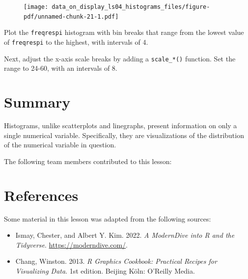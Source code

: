 \documentclass[
  letterpaper,
  DIV=11,
  numbers=noendperiod]{scrreprt}
\providecommand{\tightlist}{%
  \setlength{\itemsep}{0pt}\setlength{\parskip}{0pt}}\usepackage{longtable,booktabs,array}
\begin{document}
\begin{figure}[H]

{\centering \texttt{[image: data\_on\_display\_ls04\_histograms\_files/figure-pdf/unnamed-chunk-21-1.pdf]}

}

\end{figure}

\begin{tcolorbox}[enhanced jigsaw, colframe=quarto-callout-tip-color-frame, colbacktitle=quarto-callout-tip-color!10!white, titlerule=0mm, opacitybacktitle=0.6, breakable, toprule=.15mm, arc=.35mm, rightrule=.15mm, colback=white, bottomrule=.15mm, opacityback=0, toptitle=1mm, left=2mm, bottomtitle=1mm, title=\textcolor{quarto-callout-tip-color}{\faLightbulb}\hspace{0.5em}{Practice}, leftrule=.75mm, coltitle=black]

Plot the \texttt{freqrespi} histogram with bin breaks that range from
the lowest value of \texttt{freqrespi} to the highest, with intervals of
4.

Next, adjust the x-axis scale breaks by adding a \texttt{scale\_*()}
function. Set the range to 24-60, with an intervals of 8.

\end{tcolorbox}

\hypertarget{summary-1}{%
\section{Summary}\label{summary-1}}

Histograms, unlike scatterplots and linegraphs, present information on
only a single numerical variable. Specifically, they are visualizations
of the distribution of the numerical variable in question.

The following team members contributed to this lesson:

\hypertarget{references-3}{%
\section*{References}\label{references-3}}


Some material in this lesson was adapted from the following sources:

\begin{itemize}
\tightlist
\item
  Ismay, Chester, and Albert Y. Kim. 2022. \emph{A ModernDive into R and
  the Tidyverse}. \url{https://moderndive.com/}.
\item
  Chang, Winston. 2013. \emph{R Graphics Cookbook: Practical Recipes for
  Visualizing Data}. 1st edition. Beijing Köln: O'Reilly Media.
\end{itemize}
\end{document}

